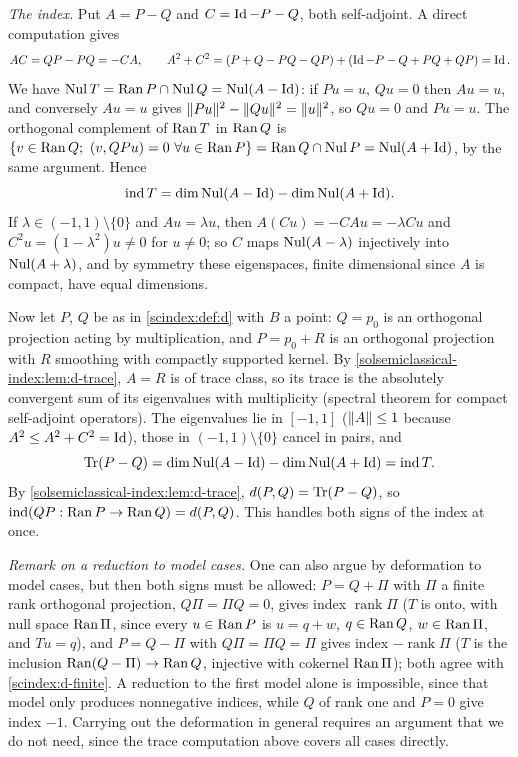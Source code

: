 \emph{The index.} Put $A=P-Q$ and $C=\operatorname{Id}-P-Q$, both self-adjoint. A direct
computation gives
\begin{equation*}
  AC=QP-PQ=-CA,\qquad A^2+C^2=(P+Q-PQ-QP)+(\operatorname{Id}-P-Q+PQ+QP)=\operatorname{Id} .
\end{equation*}
We have $\operatorname{Nul} T=\operatorname{Ran} P\cap\operatorname{Nul} Q=\operatorname{Nul}(A-\operatorname{Id})$: if $Pu=u$, $Qu=0$ then $Au=u$, and
conversely $Au=u$ gives $\lVert Pu\rVert^2-\lVert Qu\rVert^2=\lVert u\rVert^2$, so $Qu=0$ and $Pu=u$.
The orthogonal complement of $\operatorname{Ran} T$ in $\operatorname{Ran} Q$ is $\{v\in\operatorname{Ran} Q;\ ( v, QPu)=0\
\forall u\in\operatorname{Ran} P\}=\operatorname{Ran} Q\cap\operatorname{Nul} P=\operatorname{Nul}(A+\operatorname{Id})$, by the same argument. Hence
\begin{equation*}
  \operatorname{ind} T=\dim\operatorname{Nul}(A-\operatorname{Id})-\dim\operatorname{Nul}(A+\operatorname{Id}).
\end{equation*}
If $\lambda\in(-1,1)\setminus\{0\}$ and $Au=\lambda u$, then $A(Cu)=-CAu=-\lambda Cu$
and $C^2u=(1-\lambda^2)u\ne0$ for $u\ne0$; so $C$ maps $\operatorname{Nul}(A-\lambda)$ injectively
into $\operatorname{Nul}(A+\lambda)$, and by symmetry these eigenspaces, finite dimensional since
$A$ is compact, have equal dimensions.

Now let $P$, $Q$ be as in \cref{scindex:def:d} with $B$ a point: $Q=p_0$ is an
orthogonal projection acting by multiplication, and $P=p_0+R$ is an orthogonal
projection with $R$ smoothing with compactly supported kernel. By
\cref{solsemiclassical-index:lem:d-trace}, $A=R$ is of trace class, so its trace is
the absolutely convergent sum of its eigenvalues with multiplicity (spectral theorem
for compact self-adjoint operators). The eigenvalues lie in $[-1,1]$
($\lVert A\rVert\le1$ because $A^2\le A^2+C^2=\operatorname{Id}$), those in $(-1,1)\setminus\{0\}$ cancel
in pairs, and
\begin{equation*}
  \operatorname{Tr}(P-Q)=\dim\operatorname{Nul}(A-\operatorname{Id})-\dim\operatorname{Nul}(A+\operatorname{Id})=\operatorname{ind} T .
\end{equation*}
By \cref{solsemiclassical-index:lem:d-trace}, $d(P,Q)=\operatorname{Tr}(P-Q)$, so
$\operatorname{ind}(QP:\operatorname{Ran} P\to\operatorname{Ran} Q)=d(P,Q)$. This handles both signs of the index at once.

\emph{Remark on a reduction to model cases.} One can also argue by deformation to
model cases, but then both signs must be allowed: $P=Q+\Pi$ with $\Pi$ a finite
rank orthogonal projection, $Q\Pi=\Pi Q=0$, gives index $\operatorname{rank}\Pi$
($T$ is onto, with null space $\operatorname{Ran}\Pi$, since every $u\in\operatorname{Ran} P$ is $u=q+w$,
$q\in\operatorname{Ran} Q$, $w\in\operatorname{Ran}\Pi$, and $Tu=q$), and $P=Q-\Pi$ with $Q\Pi=\Pi Q=\Pi$ gives
index $-\operatorname{rank}\Pi$ ($T$ is the inclusion $\operatorname{Ran}(Q-\Pi)\to\operatorname{Ran} Q$, injective
with cokernel $\operatorname{Ran}\Pi$); both agree with \ref{scindex:d-finite}. A reduction to the
first model alone is impossible, since that model only produces nonnegative
indices, while $Q$ of rank one and $P=0$ give index $-1$. Carrying out the
deformation in general requires an argument that we do not need, since the trace
computation above covers all cases directly.

